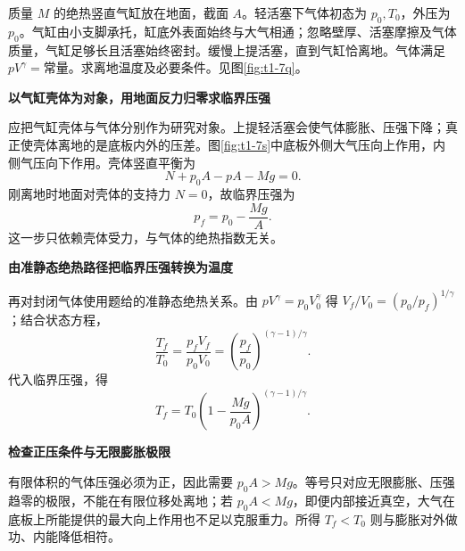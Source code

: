 \par\medskip\noindent\begin{minipage}{\textwidth}
\begin{example}[提起气缸的临界压强]\label{t1-7}
质量 $M$ 的绝热竖直气缸放在地面，截面 $A$。轻活塞下气体初态为 $p_0,T_0$，外压为 $p_0$。气缸由小支脚承托，缸底外表面始终与大气相通；忽略壁厚、活塞摩擦及气体质量，气缸足够长且活塞始终密封。缓慢上提活塞，直到气缸恰离地。气体满足 $pV^\gamma=\text{常量}$。求离地温度及必要条件。见图\ref{fig:t1-7q}。
\end{example}
\end{minipage}
\begin{solution}\textbf{以气缸壳体为对象，用地面反力归零求临界压强}\par\nobreak
应把气缸壳体与气体分别作为研究对象。上提轻活塞会使气体膨胀、压强下降；真正使壳体离地的是底板内外的压差。图\ref{fig:t1-7s}中底板外侧大气压向上作用，内侧气压向下作用。壳体竖直平衡为
\[N+p_0A-pA-Mg=0.\]
刚离地时地面对壳体的支持力 $N=0$，故临界压强为
\[\boxed{p_f=p_0-\frac{Mg}{A}}.\]
这一步只依赖壳体受力，与气体的绝热指数无关。



\par\medskip{}\noindent\textbf{由准静态绝热路径把临界压强转换为温度}\par\nobreak
再对封闭气体使用题给的准静态绝热关系。由 $pV^\gamma=p_0V_0^\gamma$ 得 $V_f/V_0=(p_0/p_f)^{1/\gamma}$；结合状态方程，
\[\frac{T_f}{T_0}=\frac{p_fV_f}{p_0V_0}
=\left(\frac{p_f}{p_0}\right)^{(\gamma-1)/\gamma}.\]
代入临界压强，得
\[\boxed{T_f=T_0\left(1-\frac{Mg}{p_0A}\right)^{(\gamma-1)/\gamma}}.\]


\par\medskip{}\noindent\textbf{检查正压条件与无限膨胀极限}\par\nobreak
有限体积的气体压强必须为正，因此需要 $\boxed{p_0A>Mg}$。等号只对应无限膨胀、压强趋零的极限，不能在有限位移处离地；若 $p_0A<Mg$，即便内部接近真空，大气在底板上所能提供的最大向上作用也不足以克服重力。所得 $T_f<T_0$ 则与膨胀对外做功、内能降低相符。
\end{solution}
